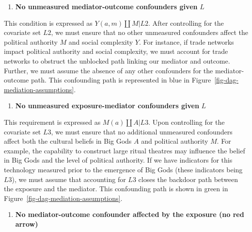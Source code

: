\documentclass[
  singlecolumn]{report}
\providecommand{\tightlist}{%
  \setlength{\itemsep}{0pt}\setlength{\parskip}{0pt}}\usepackage{longtable,booktabs,array}
\begin{document}
\begin{enumerate}
\def\labelenumi{\arabic{enumi}.}
\setcounter{enumi}{1}
\tightlist
\item
  \textbf{No unmeasured mediator-outcome confounders given} \(L\)
\end{enumerate}

This condition is expressed as \(Y(a,m) \coprod M | L2\). After
controlling for the covariate set \(L2\), we must ensure that no other
unmeasured confounders affect the political authority \(M\) and social
complexity \(Y\). For instance, if trade networks impact political
authority and social complexity, we must account for trade networks to
obstruct the unblocked path linking our mediator and outcome. Further,
we must assume the absence of any other confounders for the
mediator-outcome path. This confounding path is represented in blue in
Figure~\ref{fig-dag-mediation-assumptions}.

\begin{enumerate}
\def\labelenumi{\arabic{enumi}.}
\setcounter{enumi}{2}
\tightlist
\item
  \textbf{No unmeasured exposure-mediator confounders given} \(L\)
\end{enumerate}

This requirement is expressed as \(M(a) \coprod A | L3\). Upon
controlling for the covariate set \(L3\), we must ensure that no
additional unmeasured confounders affect both the cultural beliefs in
Big Gods \(A\) and political authority \(M\). For example, the
capability to construct large ritual theatres may influence the belief
in Big Gods and the level of political authority. If we have indicators
for this technology measured prior to the emergence of Big Gods (these
indicators being \(L3\)), we must assume that accounting for \(L3\)
closes the backdoor path between the exposure and the mediator. This
confounding path is shown in green in
Figure~\ref{fig-dag-mediation-assumptions}.

\begin{enumerate}
\def\labelenumi{\arabic{enumi}.}
\setcounter{enumi}{3}
\tightlist
\item
  \textbf{No mediator-outcome confounder affected by the exposure (no
  red arrow)}
\end{enumerate}
\end{document}
